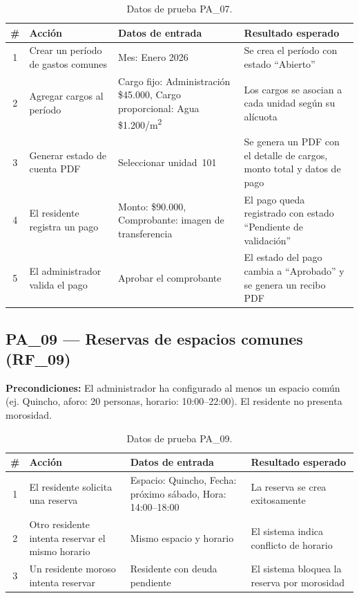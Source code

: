 \begin{table}[H]
\centering
\small
\begin{tabular}{|c|p{}|p{}|p{}|}
\hline
\textbf{\#} & \textbf{Acción} & \textbf{Datos de entrada} & \textbf{Resultado esperado} \\ \hline
1 & Crear un período de gastos comunes & Mes: Enero 2026 & Se crea el período con estado ``Abierto'' \\ \hline
2 & Agregar cargos al período & Cargo fijo: Administración \$45.000, Cargo proporcional: Agua \$1.200/m\textsuperscript{2} & Los cargos se asocian a cada unidad según su alícuota \\ \hline
3 & Generar estado de cuenta PDF & Seleccionar unidad~101 & Se genera un PDF con el detalle de cargos, monto total y datos de pago \\ \hline
4 & El residente registra un pago & Monto: \$90.000, Comprobante: imagen de transferencia & El pago queda registrado con estado ``Pendiente de validación'' \\ \hline
5 & El administrador valida el pago & Aprobar el comprobante & El estado del pago cambia a ``Aprobado'' y se genera un recibo PDF \\ \hline
\end{tabular}
\caption{Datos de prueba PA\_07.}
\end{table}

\subsection{PA\_09 — Reservas de espacios comunes (RF\_09)}

\textbf{Precondiciones:} El administrador ha configurado al menos un espacio común (ej. Quincho, aforo: 20 personas, horario: 10:00--22:00). El residente no presenta morosidad.

\begin{table}[H]
\centering
\small
\begin{tabular}{|c|p{}|p{}|p{}|}
\hline
\textbf{\#} & \textbf{Acción} & \textbf{Datos de entrada} & \textbf{Resultado esperado} \\ \hline
1 & El residente solicita una reserva & Espacio: Quincho, Fecha: próximo sábado, Hora: 14:00--18:00 & La reserva se crea exitosamente \\ \hline
2 & Otro residente intenta reservar el mismo horario & Mismo espacio y horario & El sistema indica conflicto de horario \\ \hline
3 & Un residente moroso intenta reservar & Residente con deuda pendiente & El sistema bloquea la reserva por morosidad \\ \hline
\end{tabular}
\caption{Datos de prueba PA\_09.}
\end{table}

